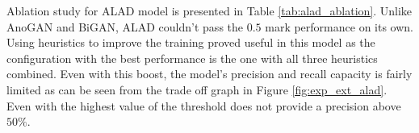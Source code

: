 Ablation study for ALAD model is presented in Table \ref{tab:alad_ablation}. Unlike AnoGAN and
BiGAN, ALAD couldn't pass the $0.5$ mark performance on its own. Using heuristics to improve the
training proved useful in this model as the configuration with the best performance is the one with
all three heuristics combined. Even with this boost, the model's precision and recall capacity is
fairly limited as can be seen from the trade off graph in Figure \ref{fig:exp_ext_alad}. Even with
the highest value of the threshold does not provide a precision above $50\%$. 

\begin{table}[!h]
	\centering
	\caption{Ablation study for ALAD to test the effect of various training improvements for stabilization.}
	\label{tab:alad_ablation}
\end{table}

